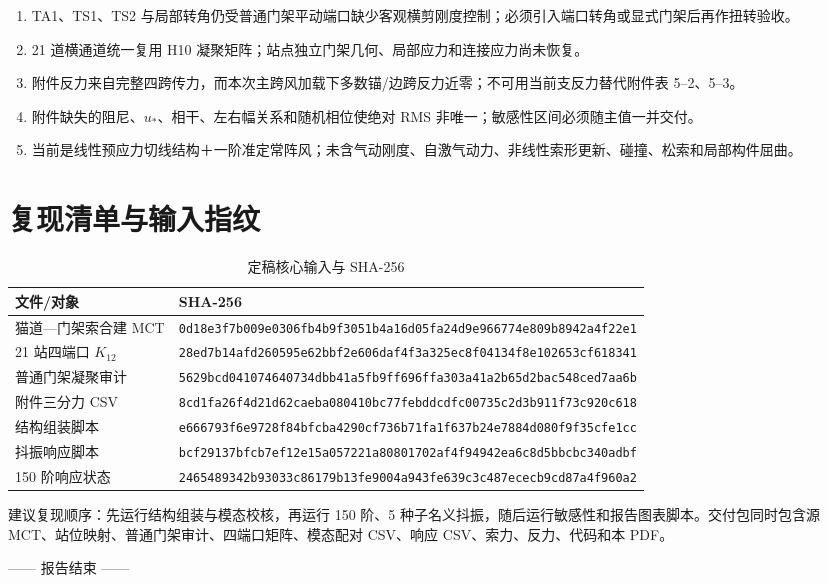 \documentclass[11pt,a4paper]{article}
\begin{document}
\begin{warningbox}[不得升级为设计验收的内容]
\begin{enumerate}
\item TA1、TS1、TS2 与局部转角仍受普通门架平动端口缺少客观横剪刚度控制；必须引入端口转角或显式门架后再作扭转验收。
\item 21 道横通道统一复用 H10 凝聚矩阵；站点独立门架几何、局部应力和连接应力尚未恢复。
\item 附件反力来自完整四跨传力，而本次主跨风加载下多数锚/边跨反力近零；不可用当前支反力替代附件表 5--2、5--3。
\item 附件缺失的阻尼、$u_*$、相干、左右幅关系和随机相位使绝对 RMS 非唯一；敏感性区间必须随主值一并交付。
\item 当前是线性预应力切线结构＋一阶准定常阵风；未含气动刚度、自激气动力、非线性索形更新、碰撞、松索和局部构件屈曲。
\end{enumerate}
\end{warningbox}

\section{复现清单与输入指纹}
\begin{table}[H]
\centering
\caption{定稿核心输入与 SHA-256}
\scriptsize
\begin{tabularx}{\textwidth}{L L}
\toprule
文件/对象 & SHA-256 \\
\midrule
猫道—门架索合建 MCT & {\tiny\texttt{0d18e3f7b009e0306fb4b9f3051b4a16d05fa24d9e966774e809b8942a4f22e1}} \\
21 站四端口 $K_{12}$ & {\tiny\texttt{28ed7b14afd260595e62bbf2e606daf4f3a325ec8f04134f8e102653cf618341}} \\
普通门架凝聚审计 & {\tiny\texttt{5629bcd041074640734dbb41a5fb9ff696ffa303a41a2b65d2bac548ced7aa6b}} \\
附件三分力 CSV & {\tiny\texttt{8cd1fa26f4d21d62caeba080410bc77febddcdfc00735c2d3b911f73c920c618}} \\
结构组装脚本 & {\tiny\texttt{e666793f6e9728f84bfcba4290cf736b71fa1f637b24e7884d080f9f35cfe1cc}} \\
抖振响应脚本 & {\tiny\texttt{bcf29137bfcb7ef12e15a057221a80801702af4f94942ea6c8d5bbcbc340adbf}} \\
150 阶响应状态 & {\tiny\texttt{2465489342b93033c86179b13fe9004a943fe639c3c487ececb9cd87a4f960a2}} \\
\bottomrule
\end{tabularx}
\end{table}

建议复现顺序：先运行结构组装与模态校核，再运行 150 阶、5 种子名义抖振，随后运行敏感性和报告图表脚本。交付包同时包含源 MCT、站位映射、普通门架审计、四端口矩阵、模态配对 CSV、响应 CSV、索力、反力、代码和本 PDF。

\vfill
\begin{center}
\color{Gray}\small —— 报告结束 ——
\end{center}
\end{document}

